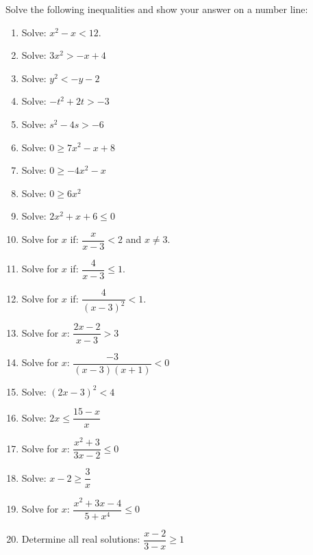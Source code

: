 \begin{eocexercises}{}
Solve the following inequalities and show your answer on a number line:
\begin{enumerate}
\item{Solve: $x^2-x<12$.}
\item{Solve: $3x^2 > -x + 4$}
\item{Solve: $y^2 < -y - 2$}
\item{Solve: $-t^2 + 2t > -3$}
\item{Solve: $s^2 - 4s > -6$}
\item{Solve: $0\geq7x^2-x+8$}
\item{Solve: $0\geq -4x^2-x$}
\item{Solve: $0\geq6x^2$}
\item{Solve: $2x^2 + x + 6\leq0$}
\item{Solve for $x$ if: $\dfrac{x}{x-3} < 2$ and $x \neq 3$.}
\item{Solve for $x$ if: $\dfrac{4}{x-3} \leq 1$.}
\item{Solve for $x$ if: $\dfrac{4}{(x-3)^2} < 1$.}
\item{Solve for $x$: $\dfrac{2x-2}{x-3} > 3$}
\item{Solve for $x$: $\dfrac{-3}{(x-3)(x+1)} <0$}
\item{Solve: $(2x-3)^2 < 4$}
\item{Solve: $2x \leq \dfrac{15-x}{x}$}
\item{Solve for $x$: \quad $\dfrac{x^2 + 3}{3x - 2} \leq 0$}
\item{Solve: $x-2 \geq \dfrac{3}{x}$}
\item{Solve for $x$: $\dfrac{x^2+3x-4}{5+x^4} \leq 0$}
\item{Determine all real solutions: $\dfrac{x-2}{3-x} \geq 1$}
\end{enumerate}



\end{eocexercises}




